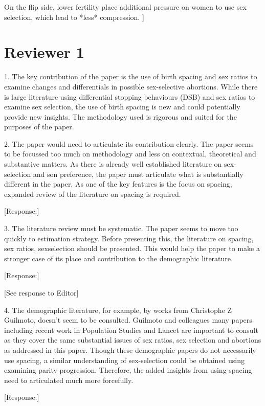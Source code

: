 \documentclass[letterpaper,12pt]{article}
\begin{document}
On the flip side, lower fertility place additional pressure on women to use
sex selection, which lead to *less* compression.
]

\newpage

\section*{Reviewer 1}


1. The key contribution of the paper is the use of birth spacing and sex
ratios to examine changes and differentials in possible sex-selective
abortions. While there is large literature using differential stopping
behaviours (DSB) and sex ratios to examine sex selection, the use of
birth spacing is new and could potentially provide new insights. The
methodology used is rigorous and suited for the purposes of the paper.

2. The paper would need to articulate its contribution clearly. The
paper seems to be focussed too much on methodology and less on
contextual, theoretical and substantive matters. As there is already
well established literature on sex-selection and son preference, the
paper must articulate what is substantially different in the paper. As
one of the key features is the focus on spacing, expanded review of the
literature on spacing is required.

[Response:]


3. The literature review must be systematic. The paper seems to move too
quickly to estimation strategy. Before presenting this, the literature
on spacing, sex ratios, sexselection should be presented. This would
help the paper to make a stronger case of its place and contribution to
the demographic literature.

[Response:]

[See response to Editor]


4. The demographic literature, for example, by works from Christophe Z
Guilmoto, doesn’t seem to be consulted. Guilmoto and colleagues many
papers including recent work in Population Studies and Lancet are
important to consult as they cover the same substantial issues of sex
ratios, sex selection and abortions as addressed in this paper. Though
these demographic papers do not necessarily use spacing, a similar
understanding of sex-selection could be obtained using examining parity
progression. Therefore, the added insights from using spacing need to
articulated much more forcefully.

[Response:]
\end{document}
